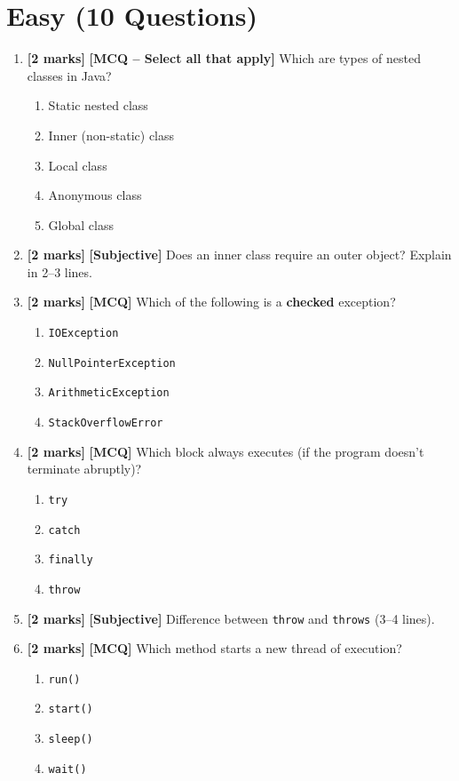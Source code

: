 \documentclass[11pt,a4paper]{article}
\newcommand{\EMarks}{\textbf{[2 marks]} }
\begin{document}
\section*{Easy (10 Questions)}
\begin{enumerate}[label=\textbf{E\arabic*.}, leftmargin=*]
  \item \EMarks \textbf{[MCQ -- Select all that apply]} Which are types of nested classes in Java?
    \begin{enumerate}[label=(\Alph*), leftmargin=*]
      \item Static nested class
      \item Inner (non-static) class
      \item Local class
      \item Anonymous class
      \item Global class
    \end{enumerate}

  \item \EMarks \textbf{[Subjective]} Does an inner class require an outer object? Explain in 2--3 lines.

  \item \EMarks \textbf{[MCQ]} Which of the following is a \textbf{checked} exception?
    \begin{enumerate}[label=(\Alph*), leftmargin=*]
      \item \texttt{IOException}
      \item \texttt{NullPointerException}
      \item \texttt{ArithmeticException}
      \item \texttt{StackOverflowError}
    \end{enumerate}

  \item \EMarks \textbf{[MCQ]} Which block always executes (if the program doesn't terminate abruptly)?
    \begin{enumerate}[label=(\Alph*), leftmargin=*]
      \item \texttt{try}
      \item \texttt{catch}
      \item \texttt{finally}
      \item \texttt{throw}
    \end{enumerate}

  \item \EMarks \textbf{[Subjective]} Difference between \texttt{throw} and \texttt{throws} (3--4 lines).

  \item \EMarks \textbf{[MCQ]} Which method starts a new thread of execution?
    \begin{enumerate}[label=(\Alph*), leftmargin=*]
      \item \texttt{run()}
      \item \texttt{start()}
      \item \texttt{sleep()}
      \item \texttt{wait()}
    \end{enumerate}


\end{enumerate}
\end{document}
